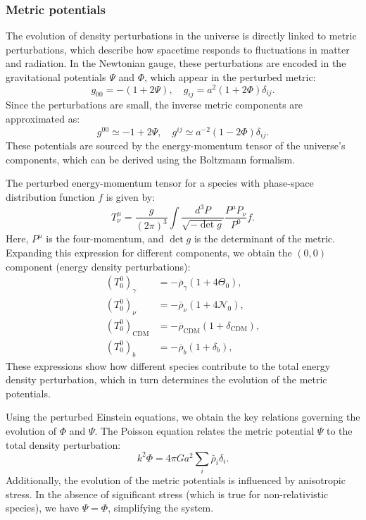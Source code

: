 \documentclass{aa}
\begin{document}
\subsubsection{Metric potentials}
\color{Plum}
The evolution of density perturbations in the universe is directly linked to metric perturbations, which describe how spacetime responds to fluctuations in matter and radiation. In the Newtonian gauge, these perturbations are encoded in the gravitational potentials $\Psi$ and $\Phi$, which appear in the perturbed metric:
\begin{equation}
g_{00} = -\left(1 + 2\Psi \right), \quad g_{ij} = a^2\left(1 + 2\Phi \right)\delta_{ij}.
\end{equation}
Since the perturbations are small, the inverse metric components are approximated as:
\begin{equation}
g^{00} \simeq -1 + 2\Psi, \quad g^{ij} \simeq a^{-2} \left(1 - 2\Phi\right) \delta_{ij}.
\end{equation}
These potentials are sourced by the energy-momentum tensor of the universe's components, which can be derived using the Boltzmann formalism.

The perturbed energy-momentum tensor for a species with phase-space distribution function $f$ is given by:
\begin{equation}
T^\mu_\nu = \frac{g}{(2\pi)^3} \int \frac{d^3P}{\sqrt{-\det g}} \frac{P^\mu P_\nu}{P^0} f.
\end{equation}
Here, $P^\mu$ is the four-momentum, and $\det g$ is the determinant of the metric. Expanding this expression for different components, we obtain the $(0,0)$ component (energy density perturbations):
\begin{align}
  \left(T_0^0\right)_\gamma &= -\overline{\rho}_\gamma\left(1+4\Theta_0\right),
  \\
  \left(T_0^0\right)_\nu &= -\overline{\rho}_\nu\left(1+4\mathcal{N}_0\right),
  \\
  \left(T_0^0\right)_\text{CDM} &= -\overline{\rho}_\text{CDM}\left(1+\delta_\text{CDM}\right),
  \\
  \left(T_0^0\right)_b &= -\overline{\rho}_b\left(1+\delta_b\right),
\end{align}
These expressions show how different species contribute to the total energy density perturbation, which in turn determines the evolution of the metric potentials.

Using the perturbed Einstein equations, we obtain the key relations governing the evolution of $\Phi$ and $\Psi$. The Poisson equation relates the metric potential $\Psi$ to the total density perturbation:
\begin{equation}
k^2 \Phi = 4\pi G a^2 \sum_i \bar{\rho}_i \delta_i.
\end{equation}
Additionally, the evolution of the metric potentials is influenced by anisotropic stress. In the absence of significant stress (which is true for non-relativistic species), we have $\Psi = \Phi$, simplifying the system.
\end{document}
